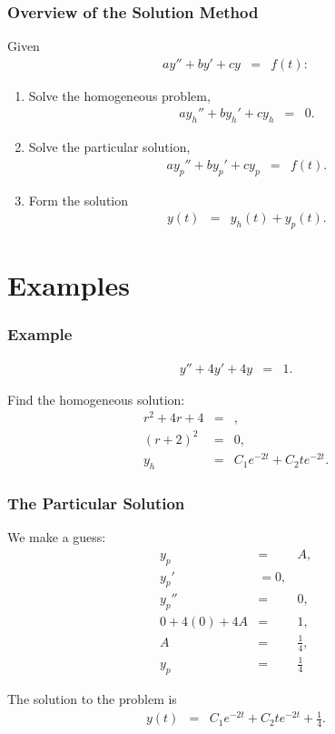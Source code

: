 \begin{frame}
  \frametitle{Overview of the Solution Method}

  Given
  \begin{eqnarray*}
    a y'' + by' + cy & = & f(t):
  \end{eqnarray*}
  \begin{enumerate}
  \item Solve the homogeneous problem,
    \begin{eqnarray*}
      a y_h'' + by_h' + cy_h & = & 0.
    \end{eqnarray*}
  \item Solve the particular solution,
    \begin{eqnarray*}
      a y_p'' + by_p' + cy_p & = & f(t).
    \end{eqnarray*}
  \item Form the solution
    \begin{eqnarray*}
      y(t) & = & y_h(t) + y_p(t).
    \end{eqnarray*}
  \end{enumerate}


\end{frame}

\section{Examples}

\begin{frame}
  \frametitle{Example}

  \begin{eqnarray*}
    y'' + 4y' + 4y & = & 1.
  \end{eqnarray*}

  {
    Find the homogeneous solution:
      \begin{eqnarray*}
        r^2 + 4r + 4 & = &, \\
        (r+2)^2 & = & 0, \\
        y_h & = & C_1 e^{-2t} + C_2 t e^{-2t}.
      \end{eqnarray*}
    }

\end{frame}


\begin{frame}
  \frametitle{The Particular Solution}
  
  We make a guess:
  \begin{eqnarray*}
    y_p & = & A, \\
    y_p' & = 0, \\
    y_p'' & = & 0, \\
    0 + 4(0) + 4A & = & 1, \\
    A & = & \frac{1}{4}, \\
    y_p & = & \frac{1}{4}
  \end{eqnarray*}

  The solution to the problem is
  \begin{eqnarray*}
    y(t) & = & C_1 e^{-2t} + C_2 t e^{-2t} + \frac{1}{4}.
  \end{eqnarray*}

\end{frame}

